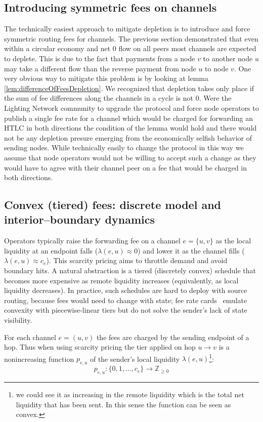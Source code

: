 \documentclass[10pt,twocolumn]{article}
\begin{document}
\subsection{Introducing symmetric fees on channels}
The technically easiest approach to mitigate depletion is to introduce and force symmetric routing fees for channels.
The previous section demonstrated that even within a circular economy and net 0 flow on all peers most channels are expected to deplete.
This is due to the fact that payments from a node $v$ to another node $u$ may take a different flow than the reverse payment from node $u$ to node $v$.
One very obvious way to mitigate this problem is by looking at lemma \ref{lem:differenceOfFeesDepletion}.
We recognized that depletion takes only place if the sum of fee differences along the channels in a cycle is not $0$.
Were the Lighting Network community to upgrade the protocol and force node operators to publish a single fee rate for a channel which would be charged for forwarding an HTLC in both directions the condition of the lemma would hold and there would not be any depletion presure emerging from the economically selfish behavior of sending nodes.
While technically easily to change the protocol in this way we assume that node operators would not be willing to accept such a change as they would have to agree with their channel peer on a fee that would be charged in both directions. 

\subsection{Convex (tiered) fees: discrete model and interior--boundary dynamics}
\label{subsec:convex-discrete}

Operators typically raise the forwarding fee on a channel $e=\{u,v\}$ as the local liquidity at an endpoint falls ($\lambda(e,u)\!\approx\!0$) and lower it as the channel fills ($\lambda(e,u)\!\approx\!c_e$). This scarcity pricing aims to throttle demand and avoid boundary hits. A natural abstraction is a tiered (discretely convex) schedule that becomes more expensive as remote liquidity increases (equivalently, as local liquidity decreases). In practice, such schedules are hard to deploy with source routing, because fees would need to change with state; fee rate cards~\cite{Neigut2022} emulate convexity with piecewise-linear tiers but do not solve the sender's lack of state visibility.

For each channel $e=(u,v)$ the fees are charged by the sending endpoint of a hop. Thus when using scarcity pricing the tier applied on hop $u\!\to\!v$ is a nonincreasing function $p_{e,u}$ of the sender’s local liquidity $\lambda(e,u)$\footnote{we could see it as increasing in the remote liquidity which is the total net liquidity that has been sent. In this sense the function can be seen as convex.}:
\[
p_{e,u}:\{0,1,\dots,c_e\}\to\mathbb{Z}_{\ge 0}
\]
\end{document}
